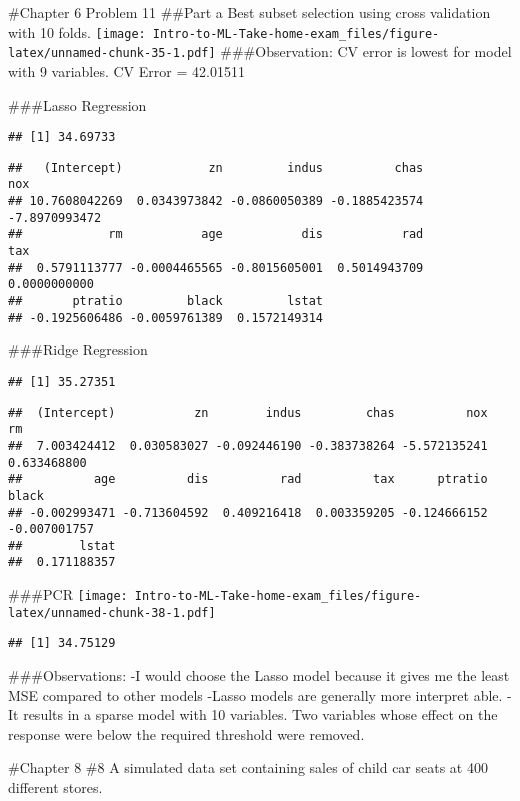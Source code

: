 \documentclass[
]{article}
\begin{document}
\#Chapter 6 Problem 11 \#\#Part a Best subset selection using cross
validation with 10 folds.
\texttt{[image: Intro-to-ML-Take-home-exam\_files/figure-latex/unnamed-chunk-35-1.pdf]}
\#\#\#Observation: CV error is lowest for model with 9 variables. CV
Error = 42.01511

\#\#\#Lasso Regression

\begin{verbatim}
## [1] 34.69733
\end{verbatim}

\begin{verbatim}
##   (Intercept)            zn         indus          chas           nox 
## 10.7608042269  0.0343973842 -0.0860050389 -0.1885423574 -7.8970993472 
##            rm           age           dis           rad           tax 
##  0.5791113777 -0.0004465565 -0.8015605001  0.5014943709  0.0000000000 
##       ptratio         black         lstat 
## -0.1925606486 -0.0059761389  0.1572149314
\end{verbatim}

\#\#\#Ridge Regression

\begin{verbatim}
## [1] 35.27351
\end{verbatim}

\begin{verbatim}
##  (Intercept)           zn        indus         chas          nox           rm 
##  7.003424412  0.030583027 -0.092446190 -0.383738264 -5.572135241  0.633468800 
##          age          dis          rad          tax      ptratio        black 
## -0.002993471 -0.713604592  0.409216418  0.003359205 -0.124666152 -0.007001757 
##        lstat 
##  0.171188357
\end{verbatim}

\#\#\#PCR
\texttt{[image: Intro-to-ML-Take-home-exam\_files/figure-latex/unnamed-chunk-38-1.pdf]}

\begin{verbatim}
## [1] 34.75129
\end{verbatim}

\#\#\#Observations: -I would choose the Lasso model because it gives me
the least MSE compared to other models -Lasso models are generally more
interpret able. -It results in a sparse model with 10 variables. Two
variables whose effect on the response were below the required threshold
were removed.

\#Chapter 8 \#8 A simulated data set containing sales of child car seats
at 400 different stores.
\end{document}
